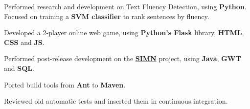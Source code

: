 \documentclass[a4paper]{deedy-resume} %
\begin{document}
\begin{minipage}[t]{0.64\textwidth}
\href{https://unbabel.com/}{}
\begin{tightitemize}
    \item Performed research and development on Text Fluency Detection, using \textbf{Python}. Focused on training a \textbf{SVM classifier} to rank sentences by fluency.
    \item Developed a 2-player online web game, using \textbf{Python’s Flask} library, \textbf{HTML}, \textbf{CSS} and \textbf{JS}.
\end{tightitemize}

\sectionspace %


\href{http://www.opensoft.pt/}{}

\begin{tightitemize}
    \item Performed post-release development on the \textbf{\href{http://www.opensoft.pt/simn/}{SIMN}} project, using \textbf{Java}, \textbf{GWT} and \textbf{SQL}.
    \item Ported build tools from \textbf{Ant} to \textbf{Maven}.
    \item Reviewed old automatic tests and inserted them in continuous integration.
\end{tightitemize}

\sectionspace %


\begin{comment}
\section{Research}

\href{https://nunoxu.github.io/downloads/MSc_Trust_HAI.pdf}{\runsubsection{Trustful Action Suggestion\\ in Human Agent Interaction}}
\descript{| MSc Thesis}

\location{September 2015 - Nov 2016 (14 months) | IST - Lisbon, PT}
In order to increase \textbf{trustfulness} in \textbf{virtual agents}, this research aimed to create a module that will suggest actions to improve trust on the agent. To this end, a \textbf{cognitive trust model} was also being implemented.



\end{comment}
\end{minipage}
\end{document}
